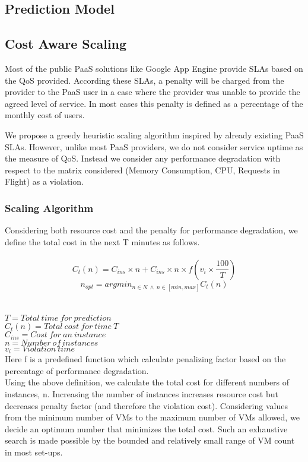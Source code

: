 \subsection{Prediction Model}

\subsection{Cost Aware Scaling}
Most of the public PaaS solutions like Google App Engine provide SLAs based on the QoS provided. According these SLAs, a penalty will be charged from the provider to the PaaS user in a case where the provider was unable to provide the agreed level of service. In most cases this penalty is defined as a percentage of the monthly cost of users.

We propose a greedy heuristic scaling algorithm inspired by already existing PaaS SLAs. However, unlike most PaaS providers, we do not consider service uptime as the measure of QoS. Instead we consider any performance degradation with respect to the matrix considered (Memory Consumption, CPU, Requests in Flight) as a violation.

\subsubsection{Scaling Algorithm}
Considering both resource cost and the penalty for performance degradation, we define the total cost in the next T minutes as follows.\\
\\
\textbf{$$ C_t(n) = C_{ins} \times n  +  C_{ins} \times n \times f(v_i \times \frac{100}{T}) $$}
$$n_{opt} = argmin_{n \in N \ \land \ n \in [min, max]}C_t(n) $$ \\
\\
$T       = Total\ time\ for\ prediction $ \\
$C_t(n)  = Total\ cost\ for\ time\ T $ \\
$C_{ins} = Cost\ for\ an\ instance$   \\
$n       = Number\ of\ instances $  \\
$v_i     = Violation\ time $ \\

Here f is a predefined function which calculate penalizing factor based on the percentage of performance degradation. \\
Using the above definition, we calculate the total cost for different numbers of instances, n. Increasing the number of instances increases resource cost but decreases penalty factor (and therefore the violation cost). Considering values from the minimum number of VMs to the maximum number of VMs allowed, we decide an optimum number that minimizes the total cost. Such an exhaustive search is made possible by the bounded and relatively small range of VM count in most set-ups.
